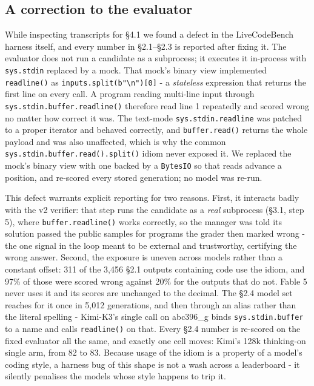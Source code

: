 \documentclass[11pt]{article}
\begin{document}
\subsection{A correction to the evaluator}

While inspecting transcripts for \S4.1 we found a defect in the LiveCodeBench harness
itself, and every number in \S2.1--\S2.3 is reported after fixing it. The evaluator does
not run a candidate as a subprocess; it executes it in-process with \texttt{sys.stdin}
replaced by a mock. That mock's binary view implemented \texttt{readline()} as
\texttt{inputs.split(b"\textbackslash n")[0]} - a \textit{stateless} expression that
returns the first line on every call. A program reading multi-line input through
\texttt{sys.stdin.buffer.readline()} therefore read line 1 repeatedly and scored wrong no
matter how correct it was. The text-mode \texttt{sys.stdin.readline} was patched to a
proper iterator and behaved correctly, and \texttt{buffer.read()} returns the whole payload
and was also unaffected, which is why the common
\texttt{sys.stdin.buffer.read().split()} idiom never exposed it. We replaced the mock's
binary view with one backed by a \texttt{BytesIO} so that reads advance a position, and
re-scored every stored generation; no model was re-run.

This defect warrants explicit reporting for two reasons. First, it interacts
badly with the v2 verifier: that step runs the candidate as a \textit{real} subprocess
(\S3.1, step 5), where \texttt{buffer.readline()} works correctly, so the manager was told
its solution passed the public samples for programs the grader then marked wrong - the one
signal in the loop meant to be external and trustworthy, certifying the wrong answer.
Second, the exposure is uneven across models rather than a constant offset: 311 of the
3{,}456 \S2.1 outputs containing code use the idiom, and 97\% of those were scored wrong
against 20\% for the outputs that do not. Fable 5 never uses it and its scores are unchanged to the
decimal. The \S2.4 model set reaches for it once in 5{,}012 generations, and then through
an alias rather than the literal spelling - Kimi-K3's single call on abc396\_g binds
\texttt{sys.stdin.buffer} to a name and calls \texttt{readline()} on that. Every \S2.4
number is re-scored on the fixed evaluator all the same, and exactly one cell moves: Kimi's
128k thinking-on single arm, from 82 to 83. Because usage of the idiom is a property of a model's coding style, a
harness bug of this shape is not a wash across a leaderboard - it silently penalises the
models whose style happens to trip it.
\end{document}
